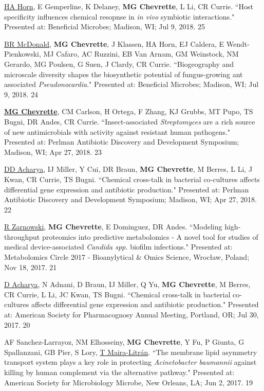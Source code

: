 \begin{cvpubs}
\cvpub
{\underline{HA Horn}, E Gemperline, K Delaney, \textbf{MG Chevrette}, L Li, CR Currie. ``Host specificity influences chemical resopnse in \textit{in vivo} symbiotic interactions." Presented at: Beneficial Microbes; Madison, WI; Jul 9, 2018.}
{25}

\cvpub
{\underline{BR McDonald}, \textbf{MG Chevrette}, J Klassen, HA Horn, EJ Caldera, E Wendt-Pienkowski, MJ Cafaro, AC Ruzzini, EB Van Arnam, GM Weinstock, NM Gerardo, MG Poulsen, G Suen, J Clardy, CR Currie. ``Biogeography and microscale diversity shapes the biosynthetic potential of fungus-growing ant associated \textit{Pseudonocardia}." Presented at: Beneficial Microbes; Madison, WI; Jul 9, 2018.}
{24}

\cvpub
{\underline{\textbf{MG Chevrette}}, CM Carlson, H Ortega, F Zhang, KJ Grubbs, MT Pupo, TS Bugni, DR Andes, CR Currie. ``Insect-associated \textit{Streptomyces} are a rich source of new antimicrobials with activity against resistant human pathogens." Presented at: Perlman Antibiotic Discovery and Development Symposium; Madison, WI; Apr 27, 2018.}
{23}

\cvpub
{\underline{DD Acharya}, IJ Miller, Y Cui, DR Braun, \textbf{MG Chevrette}, M Berres, L Li, J Kwan, CR Currie, TS Bugni. ``Chemical cross-talk in bacterial co-cultures affects differential gene expression and antibiotic production." Presented at: Perlman Antibiotic Discovery and Development Symposium; Madison, WI; Apr 27, 2018.}
{22}

\cvpub
{\underline{R Zarnowski}, \textbf{MG Chevrette}, E Dominguez, DR Andes. ``Modeling high-throughput proteomics into predictive metabolomics - A novel tool for studies of medical device-associated \textit{Candida spp.} biofilm infections." Presented at: Metabolomics Circle 2017 - Bioanylytical \& Omics Science, Wrocław, Poland; Nov 18, 2017.}
{21}

\cvpub
{\underline{D Acharya}, N Adnani, D Braun, IJ Miller, Q Yu, \textbf{MG Chevrette}, M Berres, CR Currie, L Li, JC Kwan, TS Bugni. ``Chemical cross-talk in bacterial co-cultures affects differential gene expression and antibiotic production." Presented at: American Society for Pharmacognosy Annual Meeting, Portland, OR; Jul 30, 2017.}
{20}

\cvpub
{AF Sanchez-Larrayoz, NM Elhosseiny, \textbf{MG Chevrette}, Y Fu, P Giunta, G Spallanzani, GB Pier, S Lory, \underline{T Maira-Litr\'{a}n}. ``The membrane lipid asymmetry transport system plays a key role in protecting \textit{Acinetobacter baumannii} against killing by human complement via the alternative pathway." Presented at: American Society for Microbiology Microbe, New Orleans, LA; Jun 2, 2017.}
{19}


\end{cvpubs}
